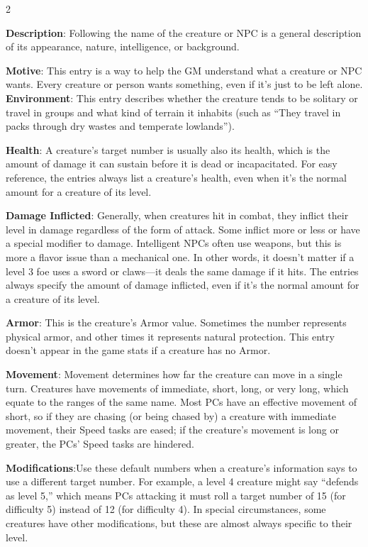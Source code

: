 \begin{multicols}{2}

\textbf{Description}: Following the name of the creature or NPC is a general description of its appearance, nature, intelligence, or background.

\textbf{Motive}: This entry is a way to help the GM understand what a creature or NPC wants. Every creature or person wants something, even if it’s just to be left alone.
\textbf{Environment}: This entry describes whether the creature tends to be solitary or travel in groups and what kind of terrain it inhabits (such as “They travel in packs through dry wastes and temperate lowlands”).

\textbf{Health}: A creature’s target number is usually also its health, which is the amount of damage it can sustain before it is dead or incapacitated. For easy reference, the entries always list a creature’s health, even when it’s the normal amount for a creature of its level.

\textbf{Damage Inflicted}: Generally, when creatures hit in combat, they inflict their level in damage regardless of the form of attack. Some inflict more or less or have a special modifier to damage. Intelligent NPCs often use weapons, but this is more a flavor issue than a mechanical one. In other words, it doesn’t matter if a level 3 foe uses a sword or claws—it deals the same damage if it hits. The entries always specify the amount of damage inflicted, even if it’s the normal amount for a creature of its level.

\textbf{Armor}: This is the creature’s Armor value. Sometimes the number represents physical armor, and other times it represents natural protection. This entry doesn’t appear in the game stats if a creature has no Armor.

\textbf{Movement}: Movement determines how far the creature can move in a single turn. Creatures have movements of immediate, short, long, or very long, which equate to the ranges of the same name. Most PCs have an effective movement of short, so if they are chasing (or being chased by) a creature with immediate movement, their Speed tasks are eased; if the creature’s movement is long or greater, the PCs’ Speed tasks are hindered.

\textbf{Modifications}:Use these default numbers when a creature’s information says to use a different target number. For example, a level 4 creature might say “defends as level 5,” which means PCs attacking it must roll a target number of 15 (for difficulty 5) instead of 12 (for difficulty 4). In special circumstances, some creatures have other modifications, but these are almost always specific to their level.


\end{multicols}
